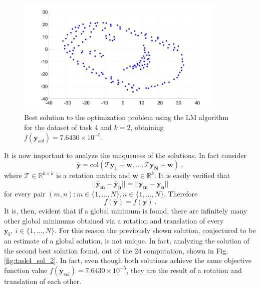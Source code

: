 \documentclass[12pt]{article}
\begin{document}
\begin{figure}[ht!]
	\centering
	\includegraphics[width=0.9\textwidth]{figures/task4_sol.png}
	\caption{Best solution to the optimization problem using the LM algorithm for the dataset of task 4 and $k=2$, obtaining $f(\mathbf{y}_{sol}) = 7.6430\times 10^{-5}$.}
	\label{fig:task4_sol}
\end{figure}
It is now important to analyze the uniqueness of the solutions. In fact consider
\begin{equation*}\label{key}
 \bar{\mathbf{y}} = \mathrm{col}(\mathcal{T}\mathbf{y_1}+\mathbf{w},\ldots,\mathcal{T}\mathbf{y_N}+\mathbf{w})\:,
\end{equation*}
where $\mathcal{T} \in \mathbb{R}^{k\times k}$ is a rotation matrix and $\mathbf{w}\in\mathbb{R}^{k}$. It is easily verified that 
\begin{equation*}\label{key}
||\mathbf{\bar{y}_m}-{\mathbf{\bar{y}_n}}|| = ||\mathbf{y_m}-\mathbf{y_n}||
\end{equation*}
for every pair $(m,n):m \in \{1,\ldots,N\}, n \in \{1,\ldots,N\}$. Therefore
\begin{equation*}\label{key}
f(\mathbf{\bar{y}}) = f(\mathbf{y})\:.
\end{equation*}
It is, then, evident that if a global minimum is found, there are infinitely many other global minimums obtained via a rotation and translation of every $\mathbf{y_i}, \; i \in \{1,\ldots,N\}$. For this reason the previously shown solution, conjectured to be an estimate of a global solution, is not unique. In fact, analyzing the solution of the second best solution found, out of the $24$ computation, shown in Fig. \ref{fig:task4_sol_2}. In fact, even though both solutions achieve the same objective function value $f(\mathbf{y}_{sol}) = 7.6430\times 10^{-5}$, they are the result of a rotation and translation of each other. 
\end{document}
